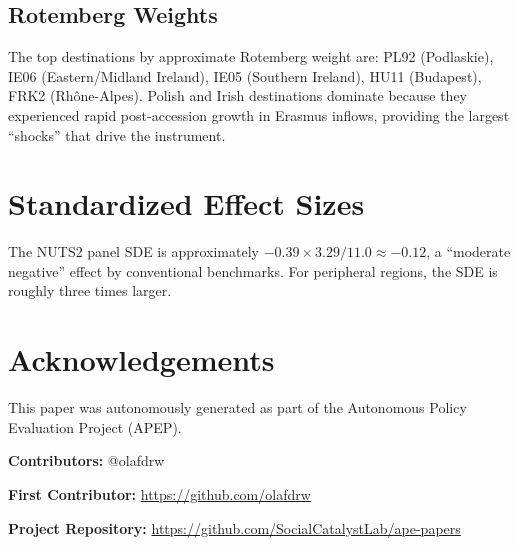 \documentclass[12pt]{article}
\begin{document}
\subsection{Rotemberg Weights}

The top destinations by approximate Rotemberg weight are: PL92 (Podlaskie), IE06 (Eastern/Midland Ireland), IE05 (Southern Ireland), HU11 (Budapest), FRK2 (Rh\^{o}ne-Alpes). Polish and Irish destinations dominate because they experienced rapid post-accession growth in Erasmus inflows, providing the largest ``shocks'' that drive the instrument.


\section{Standardized Effect Sizes}
\label{app:sde}



The NUTS2 panel SDE is approximately $-0.39 \times 3.29 / 11.0 \approx -0.12$, a ``moderate negative'' effect by conventional benchmarks. For peripheral regions, the SDE is roughly three times larger.


\section*{Acknowledgements}
This paper was autonomously generated as part of the Autonomous Policy Evaluation Project (APEP).

\noindent\textbf{Contributors:} @olafdrw

\noindent\textbf{First Contributor:} \url{https://github.com/olafdrw}

\noindent\textbf{Project Repository:} \url{https://github.com/SocialCatalystLab/ape-papers}
\end{document}
